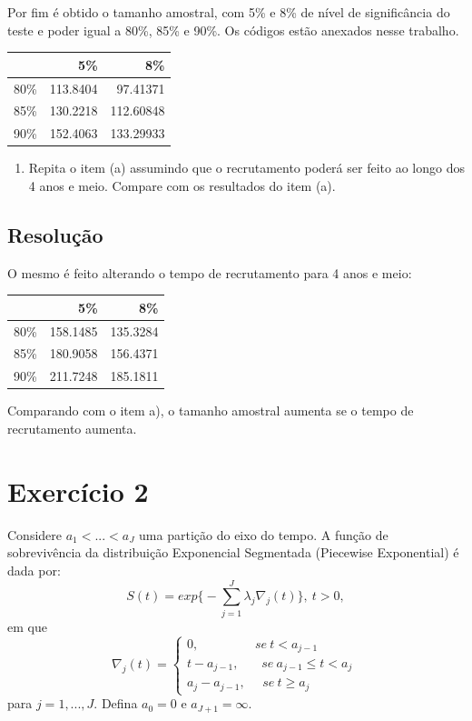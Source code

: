 \documentclass[]{article}
\providecommand{\tightlist}{%
  \setlength{\itemsep}{0pt}\setlength{\parskip}{0pt}}
\begin{document}
Por fim é obtido o tamanho amostral, com 5\% e 8\% de nível de
significância do teste e poder igual a 80\%, 85\% e 90\%. Os códigos
estão anexados nesse trabalho.

\begin{longtable}[]{@{}lrr@{}}
\toprule
& 5\% & 8\%\tabularnewline
\midrule
\endhead
80\% & 113.8404 & 97.41371\tabularnewline
85\% & 130.2218 & 112.60848\tabularnewline
90\% & 152.4063 & 133.29933\tabularnewline
\bottomrule
\end{longtable}

\begin{enumerate}
\def\labelenumi{(\alph{enumi})}
\setcounter{enumi}{1}
\tightlist
\item
  Repita o item (a) assumindo que o recrutamento poderá ser feito ao
  longo dos 4 anos e meio. Compare com os resultados do item (a).
\end{enumerate}

\subsection{Resolução}\label{resolucao-1}

O mesmo é feito alterando o tempo de recrutamento para 4 anos e meio:

\begin{longtable}[]{@{}lrr@{}}
\toprule
& 5\% & 8\%\tabularnewline
\midrule
\endhead
80\% & 158.1485 & 135.3284\tabularnewline
85\% & 180.9058 & 156.4371\tabularnewline
90\% & 211.7248 & 185.1811\tabularnewline
\bottomrule
\end{longtable}

Comparando com o item a), o tamanho amostral aumenta se o tempo de
recrutamento aumenta.

\section{Exercício 2}\label{exercicio-2}

Considere \(a_1<...<a_J\) uma partição do eixo do tempo. A função de
sobrevivência da distribuição Exponencial Segmentada (Piecewise
Exponential) é dada por:
\[S(t)=exp\Big \{ -\sum_{j=1}^J \lambda_j \nabla_j(t) \Big \}, \ t>0,\]
em que \[\nabla_j(t)= \left\{ \begin{array}{ll}
0, \ \ \ \ \ \ \ \ \ \ \ \ \ \ \ \ \ \ \ \ se \ t<a_{j-1} \\
t-a_{j-1}, \ \ \ \ \ \ \ \ se \ a_{j-1} \leq t < a_j  \\
a_j - a_{j-1}, \ \ \ \ \ \ se \ t \geq a_j \end{array} \right.\ \] para
\(j=1,...,J\). Defina \(a_0=0\) e \(a_{J+1}=\infty\).
\end{document}
